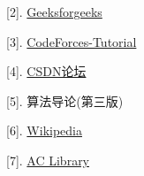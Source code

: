 \documentclass{article}
\begin{document}
[2]. \href{https://www.geeksforgeeks.org/diameter-of-a-binary-tree/}{Geeksforgeeks}

[3]. \href{https://codeforces.com/blog/entry/101271}{CodeForces-Tutorial}

[4]. \href{https://blog.csdn.net/Q_M_X_D_D_/article/details/89924963?spm=1001.2101.3001.6650.1&utm_medium=distribute.pc_relevant.none-task-blog-2%7Edefault%7ECTRLIST%7ERate-1-89924963-blog-81060586.235%5Ev28%5Epc_relevant_t0_download&depth_1-utm_source=distribute.pc_relevant.none-task-blog-2%7Edefault%7ECTRLIST%7ERate-1-89924963-blog-81060586.235%5Ev28%5Epc_relevant_t0_download&utm_relevant_index=2}{CSDN论坛}

[5]. 算法导论(第三版)

[6]. \href{https://en.wikipedia.org/wiki/Segment_tree}{Wikipedia}

[7]. \href{https://atcoder.github.io/ac-library/production/document_en/lazysegtree.html}{AC Library}
\end{document}
